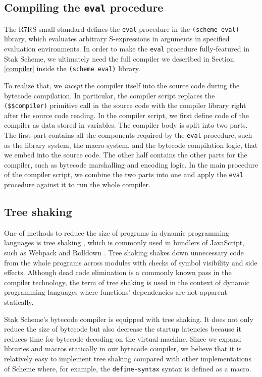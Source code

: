 \documentclass[sigplan, anonymous, review]{acmart}
\begin{document}
\subsection{Compiling the \texttt{eval} procedure} \label{inception}

The R7RS-small standard defines the \texttt{eval} procedure in the
\texttt{(scheme eval)} library, which evaluates arbitrary S-expressions in
arguments in specified evaluation environments.
In order to make the \texttt{eval} procedure fully-featured in Stak Scheme, we
ultimately need the full compiler we described in Section
\ref{compiler} inside the \texttt{(scheme eval)} library.

To realize that, we \textit{incept} the compiler itself into the
source code during the bytecode compilation.
In particular, the compiler script replaces
the \texttt{(\$\$compiler)} primitive call in the source code
with the compiler library right after the source code reading.
In the compiler script, we first define code of the compiler as
data stored in variables.
The compiler body is split into two parts.
The first part contains all the components required by the \texttt{eval}
procedure, such as the library system, the macro system, and the
bytecode compilation logic, that we embed into the source code.
The other half contains the other parts for the compiler, such
as bytecode marshalling and encoding logic.
In the main procedure of the compiler script, we combine the two
parts into one and apply the \texttt{eval} procedure against it to
run the whole compiler.

\subsection{Tree shaking}

One of methods to reduce the size of programs in dynamic programming
languages is tree shaking \cite{treeshaking}, which is commonly used
in bundlers of JavaScript, such as Webpack \cite{webpack} and Rolldown
\cite{rolldown}.
Tree shaking shakes down unnecessary code from the whole programs
across modules with checks of symbol visibility and side effects.
Although dead code elimination is a commonly known pass in the
compiler technology, the term of tree shaking is used
in the context of dynamic programming languages where functions'
dependencies are not apparent statically.

Stak Scheme's bytecode compiler is equipped with tree shaking.
It does not only reduce the size of bytecode but also
decrease the startup latencies because it reduces time for bytecode
decoding on the virtual machine.
Since we expand libraries and macros statically
in our bytecode compiler, we believe that it is relatively easy to
implement tree shaking compared with other implementations of Scheme
where, for example, the \texttt{define-syntax} syntax is defined as a macro.
\end{document}
